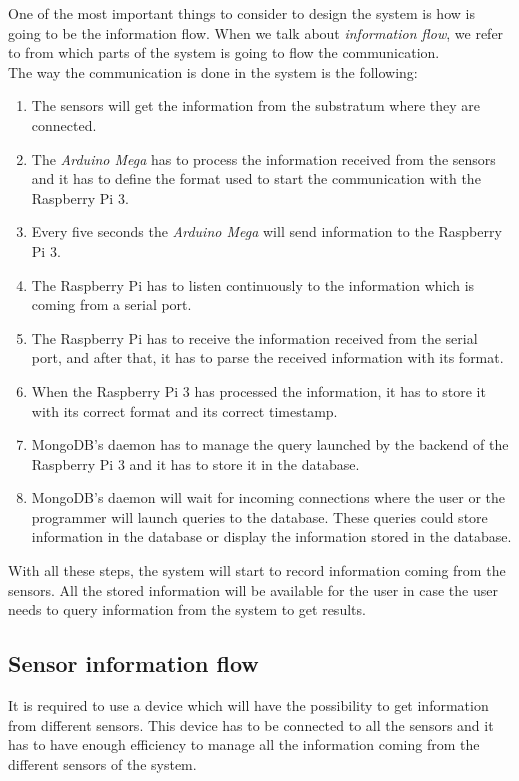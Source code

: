 One of the most important things to consider to design the system is how is going to be the information flow. When we talk about \textit{information flow}, we refer to from which parts of the system is going to flow the communication.\\

The way the communication is done in the system is the following:

\begin{enumerate}

\item The sensors will get the information from the substratum where they are connected.
\item The \textit{Arduino Mega} has to process the information received from the sensors and it has to define the format used to start the communication with the Raspberry Pi 3.
\item Every five seconds the \textit{Arduino Mega} will send information to the Raspberry Pi 3.
\item The Raspberry Pi has to listen continuously to the information which is coming from a serial port.
\item The Raspberry Pi has to receive the information received from the serial port, and after that, it has to parse the received information with its format.
\item When the Raspberry Pi 3 has processed the information, it has to store it with its correct format and its correct timestamp.
\item MongoDB's \cite{mongodb, pymongo} daemon has to manage the query launched by the backend of the Raspberry Pi 3 and it has to store it in the database.
\item MongoDB's daemon will wait for incoming connections where the user or the programmer will launch queries to the database. These queries could store information in the database or display the information stored in the database.
\end{enumerate}

With all these steps, the system will start to record information coming from the sensors. All the stored information will be available for the user in case the user needs to query information from the system to get results.

\subsection{Sensor information flow}

It is required to use a device which will have the possibility to get information from different sensors. This device has to be connected to all the sensors and it has to have enough efficiency to manage all the information coming from the different sensors of the system.\\ 

